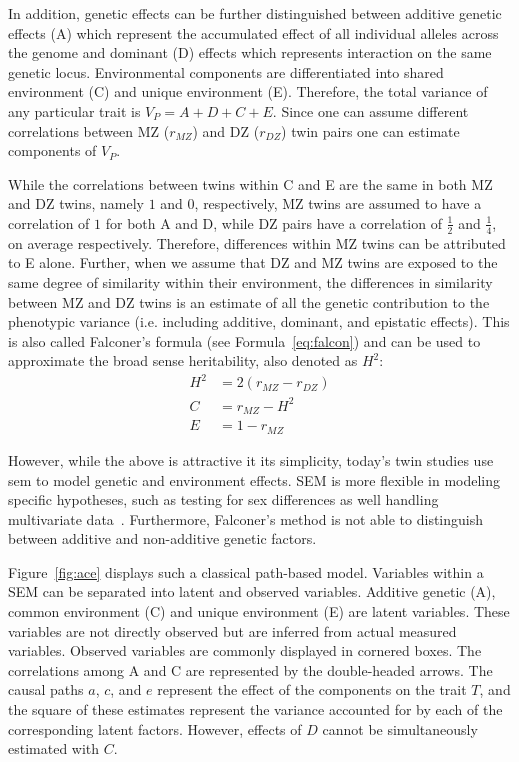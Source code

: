 In addition, genetic effects can be further distinguished between additive genetic effects (A) which represent the accumulated effect of all individual alleles across the genome and dominant (D) effects which represents interaction on the same genetic locus.
Environmental components are differentiated into shared environment (C) and unique environment (E).
Therefore, the total variance of any particular trait is $V_P = A+D+C+E$.
Since one can assume different correlations between MZ ($r_{MZ}$) and DZ ($r_{DZ}$) twin pairs one can estimate components of $V_P$.

While the correlations between twins within C and E are the same in both MZ and DZ twins, namely $1$ and $0$, respectively,
MZ twins are assumed to have a correlation of $1$ for both A and D, while DZ pairs have a correlation of $\frac{1}{2}$ and $\frac{1}{4}$, on average respectively.
Therefore, differences within MZ twins can be attributed to E alone.
Further, when we assume that DZ and MZ twins are exposed to the same degree of similarity within their environment, the differences in similarity between MZ and DZ twins is an estimate of all the genetic contribution to the phenotypic variance (i.e. including additive, dominant, and epistatic effects).
This is also called Falconer's formula (see Formula~\ref{eq:falcon}) and can be used to approximate the broad sense heritability, also denoted as $H^2$:
\begin{align}
  H^2 &= 2(r_{MZ}-r_{DZ}) \label{eq:falcon} \\ 
  C &= r_{MZ}-H^2  \\
  E &= 1-r_{MZ}  
\end{align}

However, while the above is attractive it its simplicity, today's twin studies use \acrfull{sem} to model genetic and environment effects.
SEM is more flexible in modeling specific hypotheses, such as testing for sex differences as well handling multivariate data~\cite{Rijsdijk2002}.
Furthermore, Falconer's method is not able to distinguish between additive and non-additive genetic factors.

Figure~\ref{fig:ace} displays such a classical path-based model.
Variables within a SEM can be separated into latent and observed variables.
Additive genetic (A), common environment (C) and unique environment (E) are latent variables.
These variables are not directly observed but are inferred from actual measured variables.
Observed variables are commonly displayed in cornered boxes.
The correlations among A and C are represented by the double-headed arrows.
The causal paths $a$, $c$, and $e$ represent the effect of the components on the trait $T$, and the square of these estimates represent the variance accounted for by each of the corresponding latent factors.
However, effects of $D$ cannot be simultaneously estimated with $C$.

